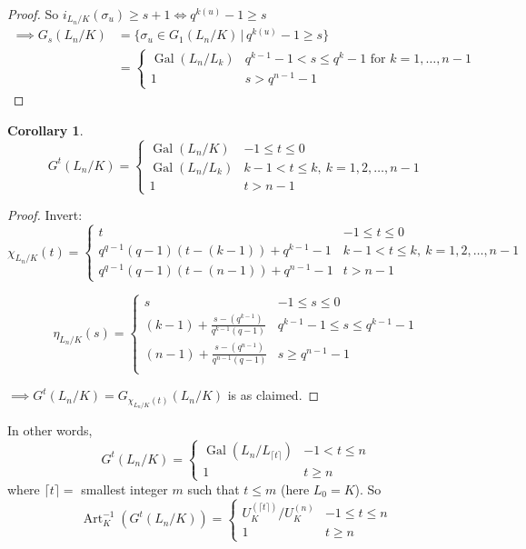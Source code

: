 \documentclass[a4paper]{article}
\theoremstyle{definition}
\theoremstyle{default}
\newtheorem{corollary}[definition]{Corollary}
\theoremstyle{remark}
\DeclareMathOperator{\Gal}{Gal}
\DeclareMathOperator{\Art}{Art}
\begin{document}
\begin{proof}
	So $i_{L_n/K}(\sigma_u) \geq s+1 \iff q^{k(u)} -1 \geq s$
	\begin{align*}
		\implies G_s(L_n/K) &= \{\sigma_u \in G_1(L_n/K) \,|\, q^{k(u)} - 1 \geq s \} \\
		&= \begin{cases}
			\Gal(L_n/L_k) & q^{k-1} -1 < s \leq q^k-1 \text{ for } k=1, \dots, n-1 \\
			1 & s > q^{n-1} - 1
		\end{cases}
	\end{align*}
\end{proof}

\begin{corollary}
	$$G^t(L_n/K) = 
		\begin{cases}
			\Gal(L_n/K) & -1 \leq t \leq 0 \\
			\Gal(L_n/L_k) & k-1 < t \leq k,\ k=1,2,\dots,n-1 \\
			1 & t > n-1
		\end{cases}$$
		\label{133}
\end{corollary}
\begin{proof}
	Invert:
	$$\chi_{L_n/K}(t) = \begin{cases}
		t & -1 \leq t \leq 0 \\
		q^{q-1}(q-1)(t-(k-1))+q^{k-1}-1 & k-1 < t \leq k,\ k=1,2,\dots,n-1 \\
		q^{q-1}(q-1)(t-(n-1))+q^{n-1}-1 & t > n-1\end{cases}$$
		
	$$\eta_{L_n/K}(s) = \begin{cases}
		s & -1 \leq s \leq 0 \\
		(k-1) + \frac{s-(q^{k-1})}{q^{k-1}(q-1)} & q^{k-1}-1 \leq s \leq q^{k-1}-1 \\
		(n-1) + \frac{s-(q^{n-1})}{q^{n-1}(q-1)} & s \geq q^{n-1}-1 \\
	\end{cases}$$
		
	$\implies G^t(L_n/K) = G_{\chi_{L_n/K}(t)}(L_n/K)$ is as claimed.
\end{proof}

In other words,
$$G^t(L_n/K) = \begin{cases}
	\Gal(L_n/L_{\lceil t \rceil}) &  -1 < t \leq n \\
	1 & t \geq n
\end{cases}$$
where $\lceil t \rceil =$ smallest integer $m$ such that $t \leq m$ (here $L_0=K$). So
$$\Art_K^{-1}(G^t(L_n/K)) = \begin{cases}
	U_K^{(\lceil t \rceil)}/U_K^{(n)} & -1 \leq t \leq n \\
	1 & t \geq n
\end{cases}$$
\end{document}
